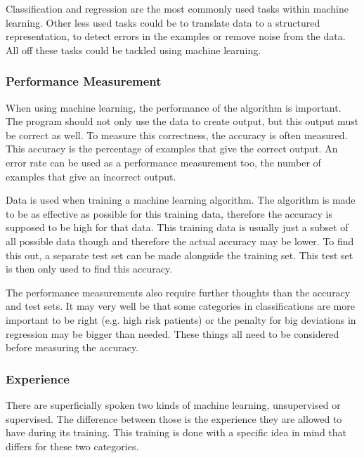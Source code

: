 \documentclass[10pt,a4paper]{article}
\begin{document}
	Classification and regression are the most commonly used tasks within 
	machine learning. Other less used tasks could be to translate data to a 
	structured representation, to detect errors in the examples or remove noise 
	from the data. All off these tasks could be tackled using machine 
	learning.\cite{Goodfellow-et-al-2016}
	
	\subsubsection{Performance Measurement}
	
	When using machine learning, the performance of the algorithm is important. 
	The program should not only use the data to create output, but this output 
	must be correct as well. To measure this correctness, the accuracy is often 
	measured. This accuracy is the percentage of examples that give the correct 
	output. An error rate can be used as a performance measurement too, the 
	number of examples that give an incorrect 
	output.\cite{Goodfellow-et-al-2016}
	
	Data is used when training a machine learning algorithm. The algorithm is 
	made to be as effective as possible for this training data, therefore the 
	accuracy is supposed to be high for that data. This training data is 
	usually just a subset of all possible data though and therefore the actual 
	accuracy may be lower. To find this out, a separate test set can be made 
	alongside the training set. This test set is then only used to find this 
	accuracy.\cite{Goodfellow-et-al-2016}
	
	The performance measurements also require further thoughts than the 
	accuracy and test sets. It may very well be that some categories in 
	classifications are more important to be right (e.g. high risk patients) or 
	the penalty for big deviations in regression may be bigger than needed. 
	These things all need to be considered before measuring the accuracy. 
	\cite{Goodfellow-et-al-2016}
	
	\subsubsection{Experience}
	
	There are superficially spoken two kinds of machine learning, unsupervised 
	or supervised. The difference between those is the experience they are 
	allowed to have during its training. This training is done with a specific 
	idea in mind that differs for these two 
	categories.\cite{Goodfellow-et-al-2016}
	
\end{document}
